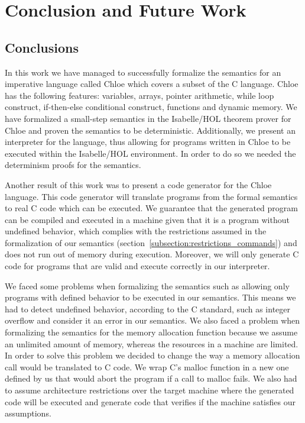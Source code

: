 \chapter{Conclusion and Future Work}\label{chapter:conclusion}

\section{Conclusions}

In this work we have managed to successfully formalize the semantics for an imperative language called Chloe which covers a subset of the C language.
Chloe has the following features: variables, arrays, pointer arithmetic, while loop construct, if-then-else conditional construct, functions and dynamic memory.
We have formalized a small-step semantics in the Isabelle/HOL theorem prover for Chloe and proven the semantics to be deterministic.
Additionally, we present an interpreter for the language, thus allowing for programs written in Chloe to be executed within the Isabelle/HOL environment.
In order to do so we needed the determinism proofs for the semantics.

Another result of this work was to present a code generator for the Chloe language.
This code generator will translate programs from the formal semantics to real C code which can be executed.
We guarantee that the generated program can be compiled and executed in a machine given that it is a program without undefined behavior, which complies with the restrictions assumed in the formalization of our semantics (section~\ref{subsection:restrictions_commands}) and does not run out of memory during execution.
Moreover, we will only generate C code for programs that are valid and execute correctly in our interpreter.

We faced some problems when formalizing the semantics such as allowing only programs with defined behavior to be executed in our semantics.
This means we had to detect undefined behavior, according to the C standard\cite{c99}, such as integer overflow and consider it an error in our semantics.
We also faced a problem when formalizing the semantics for the memory allocation function because we assume an unlimited amount of memory, whereas the resources in a machine are limited.
In order to solve this problem we decided to change the way a memory allocation call would be translated to C code.
We wrap C's malloc function in a new one defined by us that would abort the program if a call to malloc fails.
We also had to assume architecture restrictions over the target machine where the generated code will be executed and generate code that verifies if the machine satisfies our assumptions.


